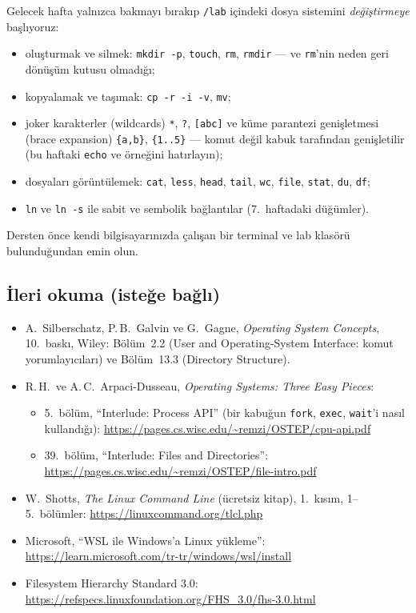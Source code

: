 \documentclass[11pt,a4paper]{article}
\newcommand{\cmd}[1]{\texttt{#1}}
\begin{document}
Gelecek hafta yalnızca bakmayı bırakıp \texttt{\tl/lab} içindeki dosya sistemini \emph{değiştirmeye} başlıyoruz:
\begin{itemize}
  \item oluşturmak ve silmek: \cmd{mkdir -p}, \cmd{touch}, \cmd{rm}, \cmd{rmdir} --- ve \cmd{rm}'nin neden geri dönüşüm kutusu olmadığı;
  \item kopyalamak ve taşımak: \cmd{cp -r -i -v}, \cmd{mv};
  \item joker karakterler (wildcards) \texttt{*}, \texttt{?}, \texttt{[abc]} ve küme parantezi genişletmesi (brace expansion) \texttt{\{a,b\}}, \texttt{\{1..5\}} --- komut değil kabuk tarafından genişletilir (bu haftaki \cmd{echo} ve \texttt{\tl} örneğini hatırlayın);
  \item dosyaları görüntülemek: \cmd{cat}, \cmd{less}, \cmd{head}, \cmd{tail}, \cmd{wc}, \cmd{file}, \cmd{stat}, \cmd{du}, \cmd{df};
  \item \cmd{ln} ve \cmd{ln -s} ile sabit ve sembolik bağlantılar (7.\ haftadaki düğümler).
\end{itemize}
Dersten önce kendi bilgisayarınızda çalışan bir terminal ve lab klasörü bulunduğundan emin olun.

\subsection*{İleri okuma (isteğe bağlı)}
\begin{itemize}
  \item A.\ Silberschatz, P.\,B.\ Galvin ve G.\ Gagne, \emph{Operating System Concepts}, 10.\ baskı, Wiley: Bölüm~2.2 (User and Operating-System Interface: komut yorumlayıcıları) ve Bölüm~13.3 (Directory Structure).
  \item R.\,H.\ ve A.\,C.\ Arpaci-Dusseau, \emph{Operating Systems: Three Easy Pieces}:
  \begin{itemize}
    \item 5.\ bölüm, ``Interlude: Process API'' (bir kabuğun \cmd{fork}, \cmd{exec}, \cmd{wait}'i nasıl kullandığı): \url{https://pages.cs.wisc.edu/~remzi/OSTEP/cpu-api.pdf}
    \item 39.\ bölüm, ``Interlude: Files and Directories'': \url{https://pages.cs.wisc.edu/~remzi/OSTEP/file-intro.pdf}
  \end{itemize}
  \item W.\ Shotts, \emph{The Linux Command Line} (ücretsiz kitap), 1.\ kısım, 1--5.\ bölümler: \url{https://linuxcommand.org/tlcl.php}
  \item Microsoft, ``WSL ile Windows'a Linux yükleme'': \url{https://learn.microsoft.com/tr-tr/windows/wsl/install}
  \item Filesystem Hierarchy Standard 3.0: \url{https://refspecs.linuxfoundation.org/FHS_3.0/fhs-3.0.html}
\end{itemize}
\end{document}
